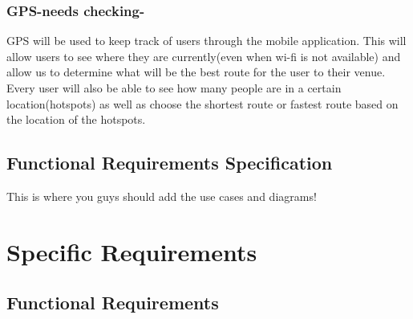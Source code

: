 \documentclass{article}
\begin{document}
\subsubsection{GPS-needs checking-}
GPS will be used to keep track of users through the mobile application. This will allow users to see where they are currently(even when wi-fi is not available) and allow us to determine what will be the best route for the user to their venue. Every user will also be able to see how many people are in a certain location(hotspots) as well as choose the shortest route or fastest route based on the location of the hotspots.
\subsection {Functional Requirements Specification}
This is where you guys should add the use cases and diagrams!
\newpage
\centering
\section{Specific Requirements}
\subsection{Functional Requirements}
\end{document}
